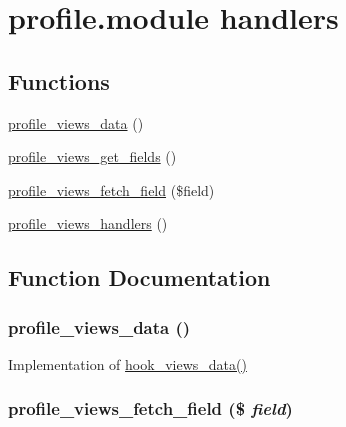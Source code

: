 \hypertarget{group__views__profile__module}{
\section{profile.module handlers}
\label{group__views__profile__module}
}
\subsection*{Functions}
\begin{CompactItemize}
\item 
\hyperlink{group__views__profile__module_ga426eb57d5065555896e709b6f109c30}{profile\_\-views\_\-data} ()
\item 
\hyperlink{group__views__profile__module_g8bf1ee086c336dadb69e8fe8728f17f0}{profile\_\-views\_\-get\_\-fields} ()
\item 
\hyperlink{group__views__profile__module_gc5cda8db9f492d20dcbf2054cd1b0ad4}{profile\_\-views\_\-fetch\_\-field} (\$field)
\item 
\hyperlink{group__views__profile__module_g64024760f0192ab4df583fa16da18b4d}{profile\_\-views\_\-handlers} ()
\end{CompactItemize}


\subsection{Function Documentation}
\hypertarget{group__views__profile__module_ga426eb57d5065555896e709b6f109c30}{
\subsubsection[{profile\_\-views\_\-data}]{\setlength{\rightskip}{0pt plus 5cm}profile\_\-views\_\-data ()}}
\label{group__views__profile__module_ga426eb57d5065555896e709b6f109c30}


Implementation of \hyperlink{group__views__hooks_g227057901681e4a33e33c199c7a8c989}{hook\_\-views\_\-data()} \hypertarget{group__views__profile__module_gc5cda8db9f492d20dcbf2054cd1b0ad4}{
\subsubsection[{profile\_\-views\_\-fetch\_\-field}]{\setlength{\rightskip}{0pt plus 5cm}profile\_\-views\_\-fetch\_\-field (\$ {\em field})}}
\label{group__views__profile__module_gc5cda8db9f492d20dcbf2054cd1b0ad4}


